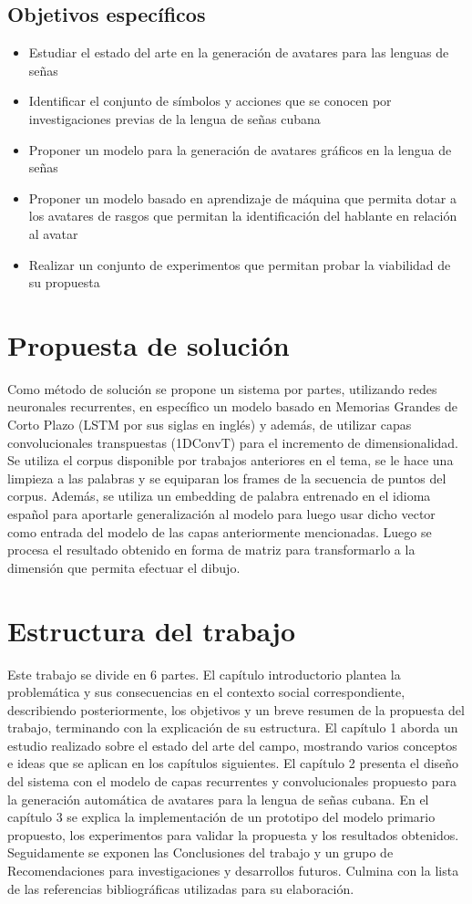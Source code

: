\subsection{Objetivos específicos}
\begin{itemize}
\item Estudiar el estado del arte en la generación de avatares para las lenguas de señas
\item Identificar el conjunto de símbolos y acciones que se conocen por investigaciones previas de la lengua de señas cubana
\item Proponer un modelo para la generación de avatares gráficos en la lengua de 
señas
\item Proponer un modelo basado en aprendizaje de máquina que permita dotar a los avatares de rasgos que permitan la identificación del hablante en relación al avatar
\item Realizar un conjunto de experimentos que permitan probar la viabilidad de su propuesta
\end{itemize}

\section{Propuesta de solución}
Como método de solución se propone un sistema por partes, utilizando redes
neuronales recurrentes, en específico un modelo basado en Memorias Grandes de Corto Plazo (LSTM por sus siglas en inglés) y además, de utilizar capas convolucionales transpuestas (1DConvT) para el incremento de dimensionalidad.
Se utiliza el corpus disponible por trabajos anteriores en el tema, se le hace una limpieza a las palabras y se equiparan los frames de la secuencia de puntos del corpus. Además, se utiliza un embedding de palabra entrenado en el idioma español para aportarle generalización al modelo para luego usar dicho vector como entrada del modelo de las capas anteriormente mencionadas. Luego se procesa el resultado obtenido en forma de matriz para transformarlo a la dimensión que permita efectuar el dibujo. 


\section{Estructura del trabajo}
Este trabajo se divide en 6 partes. El capítulo introductorio plantea la
problemática y sus consecuencias en el contexto social correspondiente, describiendo posteriormente, los objetivos y un breve resumen de la
propuesta del trabajo, terminando con la explicación de su estructura. El capítulo
1 aborda un estudio realizado sobre el estado del arte del campo, mostrando varios
conceptos e ideas que se aplican en los capítulos siguientes. El capítulo 2 presenta el diseño
del sistema con el modelo de capas recurrentes y convolucionales propuesto para la generación automática de avatares para la lengua de señas cubana. En el capítulo 3 se explica la implementación de un prototipo del modelo primario
propuesto, los experimentos para validar la propuesta y los resultados obtenidos. Seguidamente se exponen las Conclusiones del trabajo y un grupo de Recomendaciones para investigaciones y desarrollos futuros. Culmina con la lista de las referencias bibliográficas utilizadas para su elaboración.